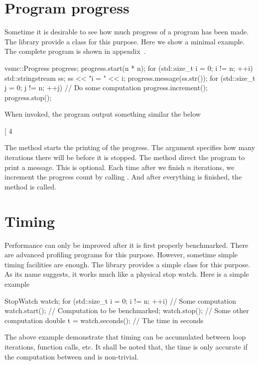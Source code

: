\section{Program progress}
\label{sec:Program progress}

Sometime it is desirable to see how much progress of a program has been made.
The library provide a  class for this purpose. Here we show
a minimal example. The complete program is shown in
appendix~.
\begin{cppcode}
  vsmc::Progress progress;
  progress.start(n * n);
  for (std::size_t i = 0; i != n; ++i) {
      std::stringstream ss;
      ss << "i = " << i;
      progress.message(ss.str());
      for (std::size_t j = 0; j != n; ++j) {
          // Do some computation
          progress.increment();
      }
  }
  progress.stop();
\end{cppcode}
When invoked, the program output something similar the below
\begin{textcode}
  [  4%
\end{textcode}
The method  starts the printing of the
progress. The argument specifies how many iterations there will be before it is
stopped. The method  direct the program
to print a message. This is optional. Each time after we finish $n$ iterations,
we increment the progress count by calling .
And after everything is finished, the method  is
called.

\section{Timing}
\label{sec:Timing}

Performance can only be improved after it is first properly benchmarked. There
are advanced profiling programs for this purpose. However, sometime simple
timing facilities are enough. The library provides a simple class
 for this purpose. As its name suggests, it works much
like a physical stop watch. Here is a simple example
\begin{cppcode}
  StopWatch watch;
  for (std::size_t i = 0; i != n; ++i) {
      // Some computation
      watch.start();
      // Computation to be benchmarked;
      watch.stop();
      // Some other computation
  }
  double t = watch.seconds(); // The time in seconds
\end{cppcode}
The above example demonstrate that timing can be accumulated between loop
iterations, function calls, etc. It shall be noted that, the time is only
accurate if the computation between  and
 is non-trivial.
